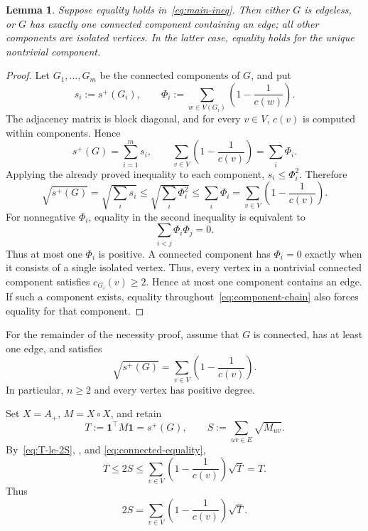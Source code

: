 \documentclass[11pt]{article}
\numberwithin{equation}{section}
\newtheorem{lemma}[theorem]{Lemma}
\theoremstyle{definition}
\theoremstyle{remark}
\newcommand{\one}{\mathbf 1}
\newcommand{\splus}{s^{+}}
\newcommand{\Aplus}{A_{+}}
\begin{document}
	\begin{lemma}\label{lem:component-reduction}
		Suppose equality holds in~\eqref{eq:main-ineq}.  Then either $G$ is
		edgeless, or $G$ has exactly one connected component containing an edge;
		all other components are isolated vertices.  In the latter case, equality
		holds for the unique nontrivial component.
	\end{lemma}
	
	\begin{proof}
		Let $G_1,\ldots,G_m$ be the connected components of $G$, and put
		\[
		s_i:=\splus(G_i),
		\qquad
		\Phi_i:=\sum\limits_{w \in V(G_i)}\left(1-\frac{1}{c(w)}\right).
		\]
		The adjacency matrix is block diagonal, and for every $v \in V$, $c(v)$ is
		computed within components.  Hence
		\[
		\splus(G)=\sum_{i=1}^m s_i,
		\qquad
		\sum_{v\in V}\left(1-\frac1{c(v)}\right)=\sum_i \Phi_i.
		\]
		Applying the already proved inequality to each component,
		$s_i\leq\Phi_i^2$.  Therefore
		\begin{equation}\label{eq:component-chain}
			\sqrt{\splus(G)}
			=\sqrt{\sum_i s_i}
			\leq\sqrt{\sum_i\Phi_i^2}
			\leq\sum_i\Phi_i
			=\sum_{v\in V}\left(1-\frac1{c(v)}\right).
		\end{equation}
		For nonnegative $\Phi_i$, equality in the second inequality is equivalent
		to
		\[
		\sum_{i<j}\Phi_i\Phi_j=0.
		\]
		Thus at most one $\Phi_i$ is positive.  A connected component has
		$\Phi_i=0$ exactly when it consists of a single isolated vertex. Thus, every
		vertex in a nontrivial connected component satisfies $c_{G_i}(v)\geq2$.
		Hence at most one component contains an edge.  If such a component exists,
		equality throughout~\eqref{eq:component-chain} also forces equality for
		that component.
	\end{proof}
	
	For the remainder of the necessity proof, assume that $G$ is connected,
	has at least one edge, and satisfies
	\begin{equation}\label{eq:connected-equality}
		\sqrt{\splus(G)}=\sum_{v\in V}\left(1-\frac1{c(v)}\right).
	\end{equation}
	In particular, $n\geq2$ and every vertex has positive degree.
	
	Set $X=\Aplus$, $M=X\circ X$, and retain
	\begin{equation}\label{eq:T-S-special}
		T:=\one^{\top}M\one=\splus(G),
		\qquad
		S:=\sum_{uv\in E}\sqrt{M_{uv}}.
	\end{equation}
	By~\eqref{eq:T-le-2S}, , and
	\eqref{eq:connected-equality},
	\[
	T\leq2S\leq\sum_{v\in V}\left(1-\frac1{c(v)}\right)\sqrt{T}=T.
	\]
	Thus
	\begin{equation}\label{eq:DNN-equality-special}
		2S=\sum_{v\in V}\left(1-\frac1{c(v)}\right)\sqrt{T}.
	\end{equation}
	
\end{document}
